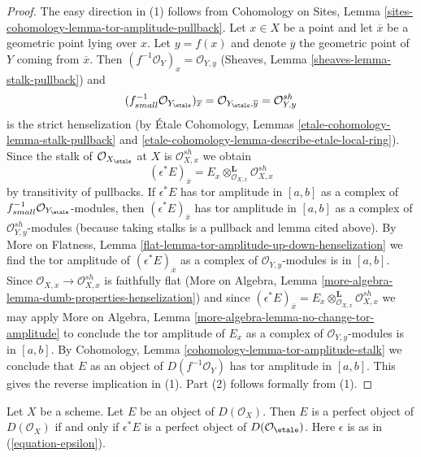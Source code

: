 \begin{proof}
The easy direction in (1) follows from Cohomology on Sites, Lemma
\ref{sites-cohomology-lemma-tor-amplitude-pullback}.
Let $x \in X$ be a point and let $\overline{x}$ be a geometric
point lying over $x$. Let $y = f(x)$ and denote $\overline{y}$
the geometric point of $Y$ coming from $\overline{x}$.
Then $(f^{-1}\mathcal{O}_Y)_x = \mathcal{O}_{Y, y}$
(Sheaves, Lemma \ref{sheaves-lemma-stalk-pullback})
and
$$
(f_{small}^{-1}\mathcal{O}_{Y_\etale})_{\overline{x}} =
\mathcal{O}_{Y_\etale, \overline{y}} =
\mathcal{O}_{Y, y}^{sh}
$$
is the strict henselization
(by \'Etale Cohomology, Lemmas \ref{etale-cohomology-lemma-stalk-pullback}
and \ref{etale-cohomology-lemma-describe-etale-local-ring}).
Since the stalk of $\mathcal{O}_{X_\etale}$ at $X$ is
$\mathcal{O}_{X, x}^{sh}$ we obtain
$$
(\epsilon^*E)_{\overline{x}} =
E_x \otimes_{\mathcal{O}_{X, x}}^\mathbf{L} \mathcal{O}_{X, x}^{sh}
$$
by transitivity of pullbacks. If $\epsilon^*E$ has tor amplitude
in $[a, b]$ as a complex of $f_{small}^{-1}\mathcal{O}_{Y_\etale}$-modules,
then $(\epsilon^*E)_{\overline{x}}$ has tor amplitude in $[a, b]$
as a complex of $\mathcal{O}_{Y, y}^{sh}$-modules
(because taking stalks is a pullback and lemma cited above). By
More on Flatness, Lemma \ref{flat-lemma-tor-amplitude-up-down-henselization}
we find the tor amplitude of
$(\epsilon^*E)_{\overline{x}}$
as a complex of $\mathcal{O}_{Y, y}$-modules is in $[a, b]$.
Since $\mathcal{O}_{X, x} \to \mathcal{O}_{X, x}^{sh}$ is faithfully
flat (More on Algebra, Lemma
\ref{more-algebra-lemma-dumb-properties-henselization}) and since
$(\epsilon^*E)_{\overline{x}} =
E_x \otimes_{\mathcal{O}_{X, x}}^\mathbf{L} \mathcal{O}_{X, x}^{sh}$
we may apply
More on Algebra, Lemma \ref{more-algebra-lemma-no-change-tor-amplitude}
to conclude the tor amplitude of $E_x$ as a complex of
$\mathcal{O}_{Y, y}$-modules is in $[a, b]$.
By Cohomology, Lemma \ref{cohomology-lemma-tor-amplitude-stalk}
we conclude that $E$ as an object of $D(f^{-1}\mathcal{O}_Y)$
has tor amplitude in $[a, b]$. This gives the reverse implication in (1).
Part (2) follows formally from (1).
\end{proof}

\begin{lemma}
\label{lemma-descend-perfect}
Let $X$ be a scheme. Let $E$ be an object of $D(\mathcal{O}_X)$.
Then $E$ is a perfect object of $D(\mathcal{O}_X)$ if and only if
$\epsilon^*E$ is a perfect object of $D(\mathcal{O}_\etale)$.
Here $\epsilon$ is as in (\ref{equation-epsilon}).
\end{lemma}

